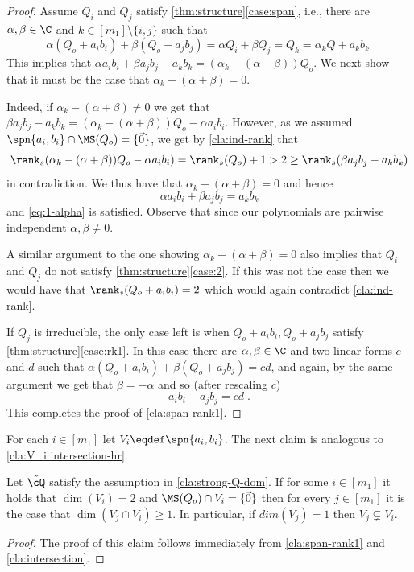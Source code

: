 \begin{proof}
Assume $Q_i$ and $Q_j$ satisfy \autoref{thm:structure}\ref{case:span}, i.e., there are $\alpha, \beta \in \C$ and $k \in [m_1]\setminus \{i,j\}$ such that 
$$\alpha (Q_o+a_ib_i) + \beta ( Q_o+a_jb_j) = \alpha Q_i + \beta Q_j = Q_k =\alpha_kQ+a_kb_k \;$$ 
This implies that $\alpha a_ib_i + \beta a_jb_j -a_kb_k = (\alpha_k-(\alpha+\beta))Q_o$.
We next show that it must be the case that $\alpha_k-(\alpha+\beta) = 0$. 

Indeed, if $\alpha_k-(\alpha+\beta)\neq 0$ we get that $\beta a_jb_j -a_kb_k = (\alpha_k-(\alpha+\beta))Q_o- \alpha a_ib_i$. However,  as we assumed 
$\spn{a_i,b_i} \cap \MS(Q_o) = \{\vec{0}\}$, we get by  \autoref{cla:ind-rank} that 
$$\rank_s(\alpha_k-(\alpha+\beta))Q_o- \alpha a_ib_i)= \rank_s(Q_o)+1 > 2 \geq \rank_s(\beta a_jb_j -a_kb_k)$$ in contradiction.
We thus have that $\alpha_k-(\alpha+\beta) = 0$ and hence
\begin{equation} \label{eq:span-ak}
 \alpha a_ib_i + \beta a_jb_j = a_kb_k
\end{equation}
and \autoref{eq:1-alpha} is satisfied. Observe that since our polynomials are pairwise independent $\alpha, \beta\neq 0$.

A similar argument to the one showing $\alpha_k-(\alpha+\beta) = 0$ also implies that  $Q_i$ and $Q_j$ do not satisfy \autoref{thm:structure}\ref{case:2}. If this was not the case then we would have that $\rank_s(Q_o+a_ib_i)= 2$ which would again contradict  \autoref{cla:ind-rank}.

If $Q_j$ is irreducible, the only case left is when $Q_o+a_ib_i, Q_o+a_jb_j$ satisfy  \autoref{thm:structure}\ref{case:rk1}. In this case there are $\alpha, \beta \in \C$ and two linear forms $c$ and $d$ such that $ \alpha (Q_o+a_ib_i) + \beta ( Q_o+a_jb_j) = cd$, and again, by the same argument we get that  $\beta = -\alpha$ and so (after rescaling $c$)
\begin{equation*}
  a_ib_i -a_jb_j = cd \;. 
\end{equation*}
This completes the proof of \autoref{cla:span-rank1}.
\end{proof}

For each $i\in [m_1]$ let $V_i \eqdef \spn{a_i,b_i}$. 
The next claim is analogous to \autoref{cla:V_i intersection-hr}.
 
 \begin{claim}\label{cla:V_i intersection}
Let $\tilde\cQ$ satisfy the assumption in \autoref{cla:strong-Q-dom}. If for some $i\in [m_1]$ it holds that $\dim(V_i)=2$ and $\MS(Q_o)\cap V_i = \{\vec{0}\}$ then for every $j \in [m_1]$ it is the case that $\dim(V_j\cap V_i) \geq 1$. In particular, if $dim(V_j)=1$ then $V_j\varsubsetneq V_i$.
\end{claim}
\begin{proof}
The proof of this claim follows immediately from \autoref{cla:span-rank1} and \autoref{cla:intersection}.
\end{proof}


